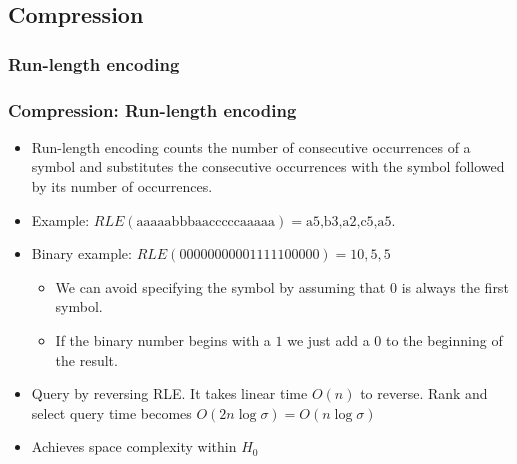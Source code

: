 \documentclass{beamer}
\begin{document}
\subsection{Compression}
\subsubsection{Run-length encoding}
\begin{frame}
\frametitle{Compression: Run-length encoding}
\begin{itemize}
\item Run-length encoding counts the number of consecutive occurrences of a symbol and substitutes the consecutive occurrences with the symbol followed by its number of occurrences.
\item Example: $RLE(\text{aaaaabbbaacccccaaaaa}) = \text{a5,b3,a2,c5,a5}$.
\item Binary example: $RLE(00000000001111100000) = 10,5,5 $
	\begin{itemize}
	\item We can avoid specifying the symbol by assuming that $0$ is always the first symbol.
	\item If the binary number begins with a $1$ we just add a $0$ to the beginning of the result.
	\end{itemize}
\item Query by reversing RLE. It takes linear time $O(n)$ to reverse. Rank and select query time becomes $O(2n \log \sigma) = O(n \log \sigma)$
\item Achieves space complexity within $H_0$
\end{itemize}
\end{frame}
\end{document}
